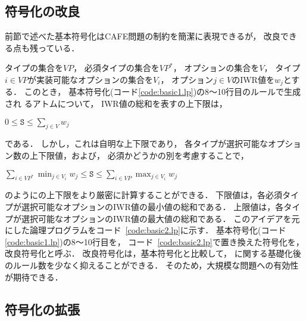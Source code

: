 \subsection{符号化の改良}

 

前節で述べた基本符号化はCAFE問題の制約を簡潔に表現できるが，
改良できる点も残っている．

タイプの集合を$VP$，
必須タイプの集合を$VP^{*}$，
オプションの集合を$V$，
タイプ$i\in VP$が実装可能なオプションの集合を$V_{i}$，
オプション$j\in V$のIWR値を$w_{j}$とする．
このとき，
基本符号化(コード\ref{code:basic1.lp})の8〜10行目のルールで生成され
るアトムについて，
IWR値の総和を表すの上下限は，
\begin{center}
\(0 \leq \texttt{S} \leq \sum_{j\in V}w_{j}\)
\end{center}
である．
しかし，これは自明な上下限であり，
各タイプが選択可能なオプション数の上下限値，および，
必須かどうかの別を考慮することで，
\begin{center}
\(
\sum_{i\in VP^{*}}\min_{j\in V_{i}}w_{j}
\leq \texttt{S} \leq
\sum_{i\in VP}\max_{j\in V_{i}}w_{j}
\)
\end{center}
のようにの上下限をより厳密に計算することができる．
下限値は，各必須タイプが選択可能なオプションのIWR値の最小値の総和である．
上限値は，各タイプが選択可能なオプションのIWR値の最大値の総和である．
このアイデアを元にした論理プログラムをコード~\ref{code:basic2.lp}に示す．
基本符号化(コード\ref{code:basic1.lp})の8〜10行目を，
コード~\ref{code:basic2.lp}で置き換えた符号化を，
改良符号化と呼ぶ．
改良符号化は，基本符号化と比較して，
に関する基礎化後のルール数を少なく抑えることができる．
そのため，大規模な問題への有効性が期待できる．

\subsection{符号化の拡張}

 

